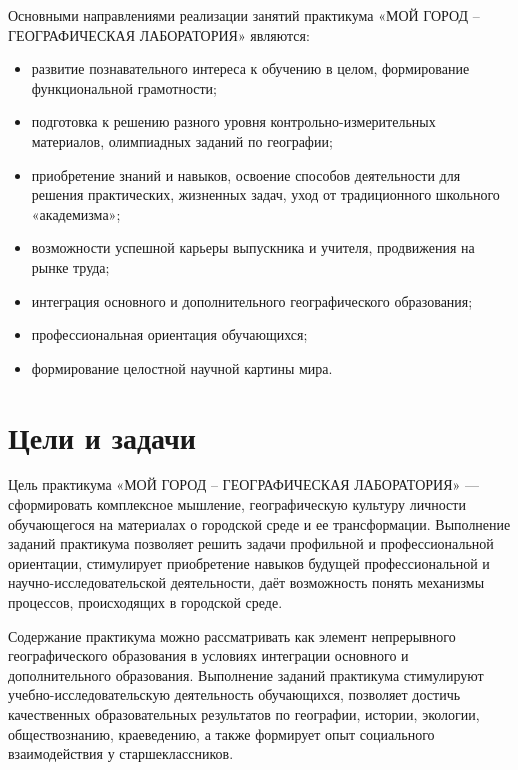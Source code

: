 \documentclass[
  11pt,
  russian,
]{book}
\begin{document}
Основными направлениями реализации занятий практикума «МОЙ ГОРОД --
ГЕОГРАФИЧЕСКАЯ ЛАБОРАТОРИЯ» являются:

\begin{itemize}
\item
  развитие познавательного интереса к обучению в целом, формирование
  функциональной грамотности;
\item
  подготовка к решению разного уровня контрольно-измерительных
  материалов, олимпиадных заданий по географии;
\item
  приобретение знаний и навыков, освоение способов деятельности для
  решения практических, жизненных задач, уход от традиционного школьного
  «академизма»;
\item
  возможности успешной карьеры выпускника и учителя, продвижения на
  рынке труда;
\item
  интеграция основного и дополнительного географического образования;
\item
  профессиональная ориентация обучающихся;
\item
  формирование целостной научной картины мира.
\end{itemize}

\hypertarget{ux446ux435ux43bux438-ux438-ux437ux430ux434ux430ux447ux438}{%
\section*{Цели и
задачи}\label{ux446ux435ux43bux438-ux438-ux437ux430ux434ux430ux447ux438}}

Цель практикума «МОЙ ГОРОД -- ГЕОГРАФИЧЕСКАЯ ЛАБОРАТОРИЯ» ---
сформировать комплексное мышление, географическую культуру личности
обучающегося на материалах о городской среде и ее трансформации.
Выполнение заданий практикума позволяет решить задачи профильной и
профессиональной ориентации, стимулирует приобретение навыков будущей
профессиональной и научно-исследовательской деятельности, даёт
возможность понять механизмы процессов, происходящих в городской среде.

Содержание практикума можно рассматривать как элемент непрерывного
географического образования в условиях интеграции основного и
дополнительного образования. Выполнение заданий практикума стимулируют
учебно-исследовательскую деятельность обучающихся, позволяет достичь
качественных образовательных результатов по географии, истории,
экологии, обществознанию, краеведению, а также формирует опыт
социального взаимодействия у старшеклассников.
\end{document}
